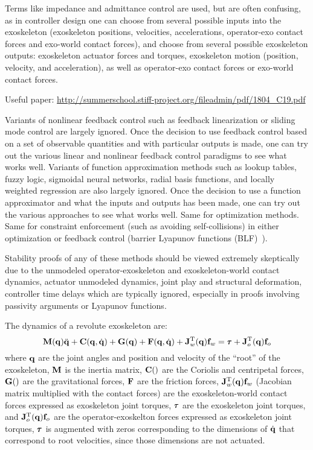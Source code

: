 \documentclass[letterpaper,12pt,fullpage]{article}
\begin{document}
Terms like impedance and admittance control are used, but are often confusing,
as in controller design one can choose from several possible
inputs into the exoskeleton (exoskeleton positions,
velocities, accelerations, operator-exo contact forces and
exo-world contact forces), and choose from several possible exoskeleton
outputs: exoskeleton actuator forces and torques, exoskeleton
motion (position, velocity, and acceleration), as well as operator-exo
contact forces or exo-world contact forces.

Useful paper: \url{http://summerschool.stiff-project.org/fileadmin/pdf/1804_C19.pdf}

Variants of nonlinear feedback control such as feedback linearization or
sliding mode control are largely ignored. Once the decision to use feedback control
based on a set of observable quantities and with particular outputs is made,
one can try out the various linear and nonlinear feedback control paradigms
to see what works well.
Variants of function approximation methods such as lookup tables, fuzzy logic,
sigmoidal neural networks, radial basis functions, and locally weighted regression
are also largely ignored. Once the decision to use a function approximator
and what the inputs and outputs has been made, one can try out the various
approaches to see what works well.
Same for optimization methods.
Same for constraint enforcement (such as avoiding self-collisions)
in either optimization or feedback control (barrier
Lyapunov functions (BLF)~\cite{IEEE06911561}).

Stability proofs of any of these methods should be viewed extremely skeptically due
to the unmodeled operator-exoskeleton and exoskeleton-world contact dynamics, 
actuator unmodeled dynamics, joint play and structural deformation, controller
time delays which are typically ignored, especially in proofs involving
passivity arguments or Lyapunov functions.

The dynamics of a revolute exoskeleton are:
\begin{equation}
\mM(\vq) \ddot{\vq} + \mC(\vq,\dot{\vq}) + \mG(\vq) + \mF(\vq,\dot{\vq})
+ \mJ_w^{\tr}(\vq) \vf_w = \vtau + \mJ_o^{\tr}(\vq) \vf_o
\label{eq:dynamics}
\end{equation}
where ${\bf q}$ are the joint angles and position and velocity of the ``root'' of
the exoskeleton, ${\bf M}$ is the inertia matrix, ${\bf C}()$ are the Coriolis and
centripetal forces, ${\bf G}()$ are the gravitational forces, ${\bf F}$ are the
friction forces, ${\bf J}_w^{{\rm T}}({\bf q}) {\bf f}_w$ (Jacobian matrix multiplied with the
contact forces)
are the exoskeleton-world
contact forces 
expressed as exoskeleton joint torques, 
$\vtau$ are the exoskeleton
joint torques,
and ${\bf J}_o^{{\rm T}}({\bf q}) {\bf f}_o$
are the operator-exoskelton forces expressed
as exoskeleton joint torques,
$\vtau$ is augmented with zeros corresponding to the dimensions of $\dot{{\bf q}}$
that correspond to root velocities, since those dimensions are not actuated.
\end{document}
